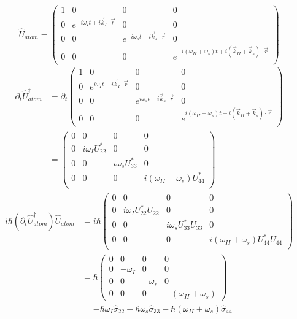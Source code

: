 \documentclass[aps,pra,showpacs,amsmath,amssymb,nofootinbib,longbibliography,superscriptaddress
]{revtex4-1}
\theoremstyle{definition}
\theoremstyle{remark}
\newcommand{\0}{\hat{0}}
\begin{document}
\begin{equation}
    \hat{U}_{atom} = \left(\begin{array}{cccc}
        1 & 0 & 0 & 0\\
        0 & e^{-i \omega_I t + i \vec{k}_I \cdot \vec{r}} & 0 & 0\\
        0 & 0 & e^{-i \omega_s t + i \vec{k}_s \cdot \vec{r}} & 0\\
        0 & 0 & 0 & e^{-i(\omega_{II} + \omega_s) t + i(\vec{k}_{II} + \vec{k}_s) \cdot \vec{r}}\\
    \end{array}\right)
\end{equation}
\begin{align}
    \partial_t \hat{U}_{atom}^{\dagger}
    &=
    \partial_t \left(\begin{array}{cccc}
        1 & 0 & 0 & 0\\
        0 & e^{i \omega_I t - i \vec{k}_I \cdot \vec{r}} & 0 & 0\\
        0 & 0 & e^{i \omega_s t - i \vec{k}_s \cdot \vec{r}} & 0\\
        0 & 0 & 0 & e^{i(\omega_{II} + \omega_s) t - i(\vec{k}_{II} + \vec{k}_s) \cdot \vec{r}}\\
    \end{array}\right) \nonumber \\
    &=
    \left(\begin{array}{cccc}
        0 & 0 & 0 & 0\\
        0 & i \omega_I U_{22}^{*} & 0 & 0\\
        0 & 0 & i \omega_s U_{33}^{*} & 0\\
        0 & 0 & 0 & i(\omega_{II} + \omega_s)U_{44}^{*}\\
    \end{array}\right) \nonumber
\end{align}
\begin{align}
    i \hbar (\partial_t \hat{U}_{atom}^{\dagger}) \hat{U}_{atom}
    &=
    i \hbar \left(\begin{array}{cccc}
        0 & 0 & 0 & 0\\
        0 & i \omega_I U_{22}^{*} U_{22} & 0 & 0\\
        0 & 0 & i \omega_s U_{33}^{*} U_{33} & 0\\
        0 & 0 & 0 & i(\omega_{II} + \omega_s)U_{44}^{*} U_{44}\\
    \end{array}\right) \nonumber\\
    &=
    \hbar \left(\begin{array}{cccc}
        0 & 0 & 0 & 0\\
        0 & -\omega_I & 0 & 0\\
        0 & 0 & -\omega_s & 0\\
        0 & 0 & 0 & -(\omega_{II} + \omega_s)
    \end{array}\right)\nonumber\\
    &=
    -\hbar \omega_I \hat{\sigma}_{22} - \hbar \omega_s \hat{\sigma}_{33} - \hbar (\omega_{II} + \omega_s) \hat{\sigma}_{44}
\end{align}
\end{document}
